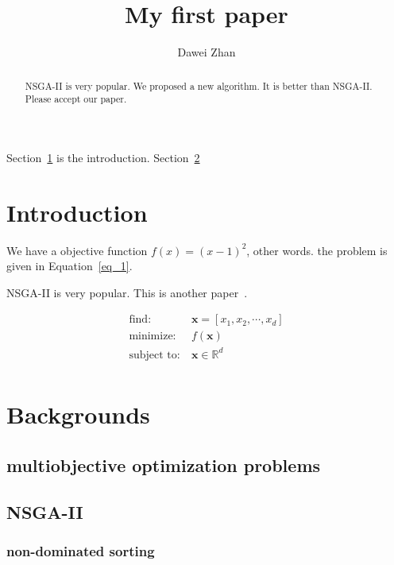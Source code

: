 \documentclass{IEEEtran}
\begin{document}
\title{My first paper}
\author{Dawei Zhan}
\maketitle	
	
\begin{abstract}
	NSGA-II is very popular. We proposed a new algorithm. It is better than NSGA-II. Please accept our paper.
\end{abstract}	
	
	
	
Section~\ref{section_introduction} is the introduction. Section~\ref{section_2}
	

\section{Introduction}
\label{section_introduction}

We have a objective function $f(x) = (x-1)^2$, other words.
the problem is given in Equation~\ref{eq_1}.


NSGA-II is very popular. This is another paper~\cite{Hosseinian_2021}.


\begin{equation}
\label{eq_1}
	\begin{split}
		\text{find:} & ~\bm{x} = [x_1,x_2,\cdots,x_d] \\
		\text{minimize:} & ~f(\bm{x}) \\
		\text{subject to:} & ~\bm{x} \in \mathbb{R}^d \\				
	\end{split}
\end{equation}








\section{Backgrounds}
\label{section_2}

\subsection{multiobjective optimization problems}

\subsection{NSGA-II}

\subsubsection{non-dominated sorting}
\end{document}
